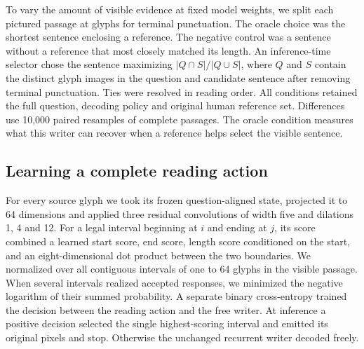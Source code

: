 \documentclass[12pt,a4paper]{article}
\providecommand{\DIFadd}[1]{{\protect\color{blue} \sf #1}} %
\begin{document}
\DIFadd{To vary the amount of visible evidence at fixed model weights, we split each pictured passage at glyphs for terminal punctuation. The oracle choice was the shortest sentence enclosing a reference. The negative control was a sentence without a reference that most closely matched its length. An inference-time selector chose the sentence maximizing $|Q\cap S|/|Q\cup S|$, where $Q$ and $S$ contain the distinct glyph images in the question and candidate sentence after removing terminal punctuation. Ties were resolved in reading order. All conditions retained the full question, decoding policy and original human reference set. Differences use 10,000 paired resamples of complete passages. The oracle condition measures what this writer can recover when a reference helps select the visible sentence.
}

\subsection*{\DIFadd{Learning a complete reading action}}
\DIFadd{For every source glyph we took its frozen question-aligned state, projected it to 64 dimensions and applied three residual convolutions of width five and dilations 1, 4 and 12. For a legal interval beginning at $i$ and ending at $j$, its score combined a learned start score, end score, length score conditioned on the start, and an eight-dimensional dot product between the two boundaries. We normalized over all contiguous intervals of one to 64 glyphs in the visible passage. When several intervals realized accepted responses, we minimized the negative logarithm of their summed probability. A separate binary cross-entropy trained the decision between the reading action and the free writer. At inference a positive decision selected the single highest-scoring interval and emitted its original pixels and stop. Otherwise the unchanged recurrent writer decoded freely.
}
\end{document}
